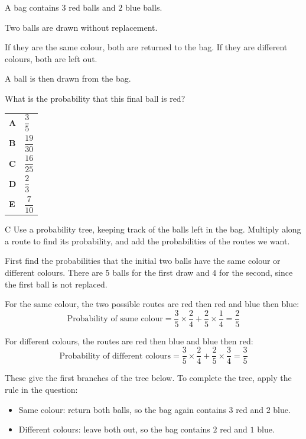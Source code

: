 \documentclass[11pt,a4paper]{article}
\begin{document}
\begin{enumerate}[label=\textbf{\arabic*.},leftmargin=*,itemsep=0pt,start=9]
A bag contains $3$ red balls and $2$ blue balls. 

Two balls are drawn without replacement. 

If they are the same colour, both are returned to the bag. If they are different colours, both are left out.

A ball is then drawn from the bag.

What is the probability that this final ball is red?

\par\vspace*{12pt}
\begin{tabularx}{\linewidth}{@{}>{\bfseries}l Y@{}}
A &
$\dfrac{3}{5}$
\\[0.8em]
B &
$\dfrac{19}{30}$
\\[0.8em]
C &
$\dfrac{16}{25}$
\\[0.8em]
D &
$\dfrac{2}{3}$
\\[0.8em]
E &
$\dfrac{7}{10}$
\\
\end{tabularx}

\begin{djsSolution}{C}
Use a probability tree, keeping track of the balls left in the bag. Multiply along a route to find its probability, and add the probabilities of the routes we want.

First find the probabilities that the initial two balls have the same colour or different colours. There are $5$ balls for the first draw and $4$ for the second, since the first ball is not replaced.

For the same colour, the two possible routes are red then red and blue then blue:
\[
\text{Probability of same colour}
=\frac35\times\frac24+\frac25\times\frac14
=\frac25
\]

For different colours, the routes are red then blue and blue then red:
\[
\text{Probability of different colours}
=\frac35\times\frac24+\frac25\times\frac34
=\frac35
\]

These give the first branches of the tree below. To complete the tree, apply the rule in the question:
\begin{itemize}
\item Same colour: return both balls, so the bag again contains $3$ red and $2$ blue.
\item Different colours: leave both out, so the bag contains $2$ red and $1$ blue.
\end{itemize}


\end{djsSolution}
\end{enumerate}
\end{document}
